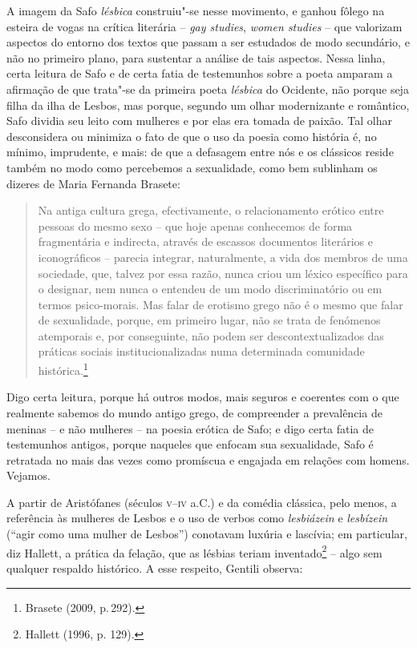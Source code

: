 A imagem da Safo \textit{lésbica} construiu"-se nesse movimento, e ganhou fôlego
na esteira de vogas na crítica literária -- \textit{gay studies}, \textit{women
studies} -- que valorizam aspectos do entorno dos textos que passam a ser
estudados de modo secundário, e não no primeiro plano, para sustentar a análise
de tais aspectos. Nessa linha, certa leitura de Safo e de certa fatia de
testemunhos sobre a poeta amparam a afirmação de que trata"-se da primeira poeta
\textit{lésbica} do Ocidente, não porque seja filha da ilha de Lesbos, mas
porque, segundo um olhar modernizante e romântico, Safo dividia seu leito com mulheres e por
elas era tomada de paixão.
Tal olhar desconsidera ou minimiza o fato de que o uso da poesia como história é, no mínimo, imprudente, e mais: de que a defasagem entre nós e os clássicos reside também no modo como percebemos a sexualidade, como bem sublinham os dizeres de Maria Fernanda Brasete:

\begin{quote}
Na antiga cultura grega, efectivamente, o relacionamento erótico entre pessoas do mesmo sexo – que hoje apenas conhecemos de forma fragmentária e indirecta, através de escassos documentos literários e iconográficos – parecia integrar, naturalmente, a vida dos membros de uma sociedade, que, talvez por essa razão, nunca criou um léxico específico para o designar, nem nunca o entendeu de um modo discriminatório ou em termos psico-morais. Mas falar de erotismo grego não é o mesmo que falar de sexualidade, porque, em primeiro lugar, não se trata de fenómenos atemporais e, por conseguinte, não podem ser descontextualizados das práticas sociais institucionalizadas numa determinada comunidade histórica.\footnote{Brasete (2009, p.\,292).}
\end{quote}


\noindent{}Digo certa leitura, porque há outros modos, mais
seguros e coerentes com o que realmente sabemos do mundo antigo grego, de
compreender a prevalência de meninas -- e não mulheres --  na poesia erótica de Safo; e digo
certa fatia de testemunhos antigos, porque naqueles que enfocam sua
sexualidade, Safo é retratada no mais das vezes como promíscua e engajada em relações com homens. Vejamos. 

A partir de Aristófanes (séculos \textsc{v}--\textsc{iv} a.C.) e da comédia clássica, pelo menos, a
referência às mulheres de Lesbos e o uso de verbos como \textit{lesbiázein} e
\textit{lesbízein} (“agir como uma mulher de Lesbos”) conotavam luxúria e
lascívia; em particular, diz Hallett, a prática da
felação, que as lésbias teriam inventado\footnote{ Hallett (1996, p. 129).} -- algo sem qualquer respaldo
histórico. A esse respeito, Gentili observa: 


